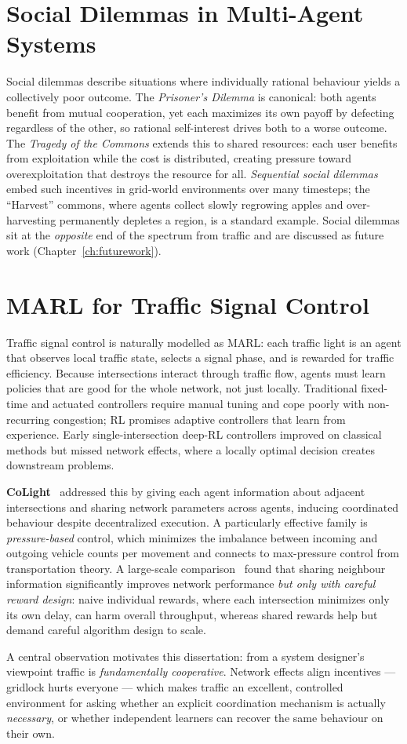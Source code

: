 \section{Social Dilemmas in Multi-Agent Systems}
Social dilemmas describe situations where individually rational behaviour yields a
collectively poor outcome. The \emph{Prisoner's Dilemma} is canonical: both agents
benefit from mutual cooperation, yet each maximizes its own payoff by defecting
regardless of the other, so rational self-interest drives both to a worse outcome.
The \emph{Tragedy of the Commons} extends this to shared resources: each user
benefits from exploitation while the cost is distributed, creating pressure toward
overexploitation that destroys the resource for all. \emph{Sequential social
dilemmas}~\cite{leibo2017ssd} embed such incentives in grid-world environments over
many timesteps; the ``Harvest'' commons, where agents collect slowly regrowing
apples and over-harvesting permanently depletes a region, is a standard example.
Social dilemmas sit at the \emph{opposite} end of the spectrum from traffic and are
discussed as future work (Chapter~\ref{ch:futurework}).

\section{MARL for Traffic Signal Control}
Traffic signal control is naturally modelled as MARL: each traffic light is an
agent that observes local traffic state, selects a signal phase, and is rewarded
for traffic efficiency. Because intersections interact through traffic flow, agents
must learn policies that are good for the whole network, not just locally.
Traditional fixed-time and actuated controllers require manual tuning and cope
poorly with non-recurring congestion; RL promises adaptive controllers that learn
from experience. Early single-intersection deep-RL controllers improved on
classical methods but missed network effects, where a locally optimal decision
creates downstream problems.

\textbf{CoLight}~\cite{wei2019colight} addressed this by giving each agent
information about adjacent intersections and sharing network parameters across
agents, inducing coordinated behaviour despite decentralized execution. A
particularly effective family is \emph{pressure-based} control, which minimizes the
imbalance between incoming and outgoing vehicle counts per movement and connects to
max-pressure control from transportation theory. A large-scale
comparison~\cite{chu2020largescale} found that sharing neighbour information
significantly improves network performance \emph{but only with careful reward
design}: naive individual rewards, where each intersection minimizes only its own
delay, can harm overall throughput, whereas shared rewards help but demand careful
algorithm design to scale.

A central observation motivates this dissertation: from a system designer's
viewpoint traffic is \emph{fundamentally cooperative}. Network effects align
incentives --- gridlock hurts everyone --- which makes traffic an excellent,
controlled environment for asking whether an explicit coordination mechanism is
actually \emph{necessary}, or whether independent learners can recover the same
behaviour on their own.

